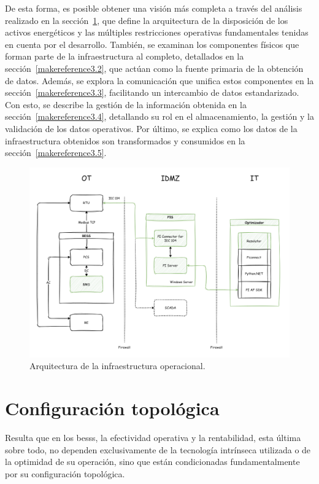 De esta forma, es posible obtener una visión más completa a través del análisis realizado en la sección~\ref{makereference3.1}, que define la arquitectura de la disposición de los activos energéticos y las múltiples restricciones operativas fundamentales tenidas en cuenta por el desarrollo. También, se examinan los componentes físicos que forman parte de la infraestructura al completo, detallados en la sección~\ref{makereference3.2}, que actúan como la fuente primaria de la obtención de datos. Además, se explora la comunicación que unifica estos componentes en la sección~\ref{makereference3.3},  facilitando un intercambio de datos estandarizado. Con esto, se describe la gestión de la información obtenida en la sección~\ref{makereference3.4}, detallando su rol en el almacenamiento, la gestión y la validación de los datos operativos. Por último, se explica como los datos de la infraestructura obtenidos son transformados y consumidos en la sección~\ref{makereference3.5}.

\begin{figure}
  \centering
  \includegraphics[width=\linewidth]{figures/arquitectura-infraestructura.png}
  \caption[Arquitectura de la infraestructura operacional.]{Arquitectura de la infraestructura operacional.}%
  \label{fig:arquitectura-infraestructura}
\end{figure}

\section{Configuración topológica}%
\label{makereference3.1}

Resulta que en los \glspl{bess}, la efectividad operativa y la rentabilidad, esta última sobre todo, no dependen exclusivamente de la tecnología intrínseca utilizada o de la optimidad de su operación, sino que están condicionadas fundamentalmente por su configuración topológica.

